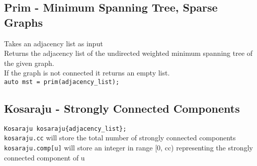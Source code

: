 \subsection{Prim - Minimum Spanning Tree, Sparse Graphs}

Takes an adjacency list as input \\
Returns the adjacency list of the undirected weighted minimum spanning tree of the given graph. \\
If the graph is not connected it returns an empty list. \\
\verb|auto mst = prim(adjacency_list);| \\



\subsection{Kosaraju - Strongly Connected Components}

\verb|Kosaraju kosaraju{adjacency_list};| \\
\verb|kosaraju.cc| will store the total number of strongly connected components \\
\verb|kosaraju.comp[u]| will store an integer in range [0, cc) representing the strongly connected component of u

